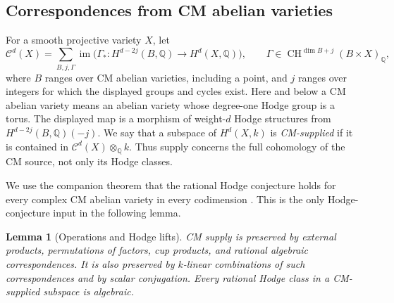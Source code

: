 \documentclass[11pt]{article}
\newcommand{\Q}{\mathbb Q}
\newcommand{\CH}{\operatorname{CH}}
\newtheorem{lemma}[theorem]{Lemma}
\numberwithin{equation}{section}
\begin{document}
\subsection{Correspondences from CM abelian varieties}

For a smooth projective variety $X$, let
\[
 \mathcal C^d(X)=
 \sum_{B,j,\Gamma}
 \operatorname{im}\bigl(
 \Gamma_*:H^{d-2j}(B,\Q)\longrightarrow H^d(X,\Q)\bigr),
 \qquad
 \Gamma\in\CH^{\dim B+j}(B\times X)_\Q ,
\]
where $B$ ranges over CM abelian varieties, including a point, and
$j$ ranges over integers for which the displayed groups and cycles
exist.  Here
and below a CM abelian variety means an abelian variety whose
degree-one Hodge group is a torus.  The displayed map is a morphism of
weight-$d$ Hodge structures from $H^{d-2j}(B,\Q)(-j)$.
We say that a subspace of $H^d(X,k)$ is \emph{CM-supplied} if it is
contained in $\mathcal C^d(X)\otimes_\Q k$.  Thus supply concerns
the full cohomology of the CM source, not only its Hodge classes.

We use the companion theorem that the rational Hodge conjecture holds
for every complex CM abelian variety in every codimension
\cite[Theorem~1.1]{OpenAICM2026}.  This is the only Hodge-conjecture
input in the following lemma.

\begin{lemma}[Operations and Hodge lifts]
\label{p3:cm-operations}
CM supply is preserved by external products, permutations of factors,
cup products, and rational algebraic correspondences.  It is also
preserved by $k$-linear combinations of such correspondences and by
scalar conjugation.  Every rational Hodge class in a CM-supplied
subspace is algebraic.
\end{lemma}
\end{document}
